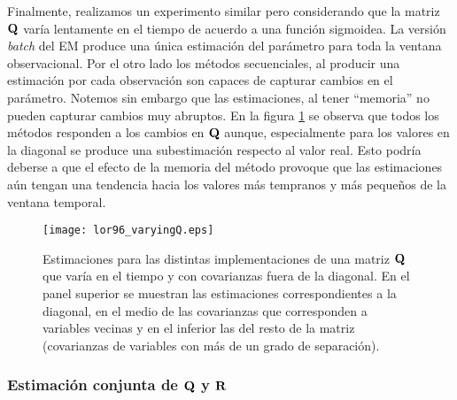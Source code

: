 Finalmente, realizamos un experimento similar pero considerando que la matriz $\mathbf{Q}$ varía lentamente en el tiempo de acuerdo a una función sigmoidea. La versión \textit{batch} del EM produce una única estimación del parámetro para toda la ventana observacional. Por el otro lado los métodos secuenciales, al producir una estimación por cada observación son capaces de capturar cambios en el parámetro. Notemos sin embargo que las estimaciones, al tener ``memoria'' no pueden capturar cambios muy abruptos. En la figura \ref{fig:lor96_varyingQ} se observa que todos los métodos responden a los cambios en $\mathbf{Q}$ aunque, especialmente para los valores en la diagonal se produce una subestimación respecto al valor real. Esto podría deberse a que el efecto de la memoria del método provoque que las estimaciones aún tengan una tendencia hacia los valores más tempranos y más pequeños de la ventana temporal. 
\begin{figure}[h]
    \centering
    \texttt{[image: lor96\_varyingQ.eps]}
    \caption{Estimaciones para las distintas implementaciones de una matriz $\mathbf{Q}$ que varía en el tiempo y con covarianzas fuera de la diagonal. En el panel superior se muestran las estimaciones correspondientes a la diagonal, en el medio de las covarianzas que corresponden a variables vecinas y en el inferior las del resto de la matriz (covarianzas de variables con más de un grado de separación).}
    \label{fig:lor96_varyingQ}
\end{figure}

\clearpage

\subsubsection{Estimación conjunta de $\mathbf{Q}$ y $\mathbf{R}$} \

